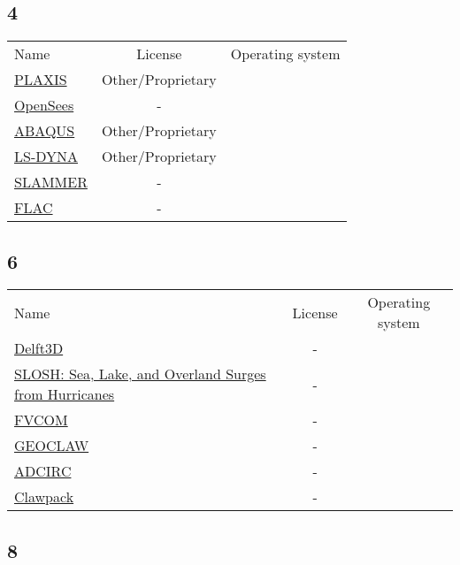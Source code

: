 \subsection{4}

\begin{table}[]
    \centering
    \begin{tabular}{l|cc}
    \toprule
    Name &  License & Operating system\\ 
        \href{https://www.bentley.com/en/products/brands/plaxis}{PLAXIS} &  Other/Proprietary  &\\
        \href{https://opensees.berkeley.edu/}{OpenSees} & - &\\
        \href{www.simulia.com}{ABAQUS} &  Other/Proprietary  &\\
        \href{http://www.lstc.com/}{LS-DYNA} &  Other/Proprietary  &\\
        \href{}{SLAMMER} & - &\\
        \href{https://www.itascacg.com/software/FLAC}{FLAC} & - &\\ 
    \bottomrule
    \end{tabular}
\end{table}

\subsection{6}

\begin{table}[]
    \centering
    \begin{tabular}{l|cc}
    \toprule
    Name &  License & Operating system\\ 
        \href{https://oss.deltares.nl/web/delft3d}{Delft3D} & - &\\
        \href{}{SLOSH: Sea, Lake, and Overland Surges from Hurricanes} & - &\\
        \href{http://fvcom.smast.umassd.edu/fvcom/}{FVCOM} & - &\\
        \href{https://depts.washington.edu/clawpack/geoclaw/}{GEOCLAW} & - &\\
        \href{https://adcirc.org/}{ADCIRC} & - &\\
        \href{https://www.clawpack.org/}{Clawpack} & - &\\ 
    \bottomrule
    \end{tabular}
\end{table}

\subsection{8}

